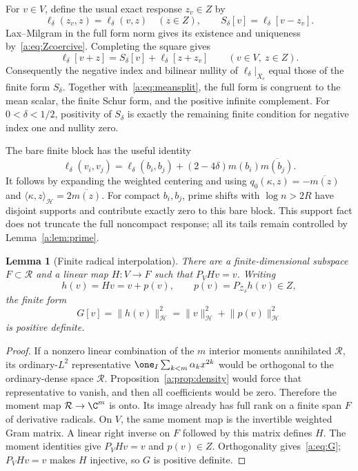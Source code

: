 \documentclass[11pt,a4paper]{article}
\numberwithin{equation}{section}
\newtheorem{lemma}[theorem]{Lemma}
\theoremstyle{definition}\newtheorem{definition}[theorem]{Definition}
\theoremstyle{remark}\newtheorem{remark}[theorem]{Remark}
\newcommand{\Hh}{\mathcal H}\newcommand{\Hw}{\mathcal H}
\newcommand{\ip}[2]{\langle#1,#2\rangle}\newcommand{\norm}[1]{\lVert#1\rVert}\newcommand{\abs}[1]{\lvert#1\rvert}
\newcommand{\Zc}{\mathcal Z_\delta}\newcommand{\Rcal}{\mathcal R}
\begin{document}
For $v\in V$, define the usual exact response $z_v\in Z$ by
\begin{equation}\label{a:eq:usualresponse}
 \ell_\delta(z_v,z)=\ell_\delta(v,z)\quad(z\in Z),\qquad
 S_\delta[v]=\ell_\delta[v-z_v].
\end{equation}
Lax--Milgram in the full form norm gives its existence and uniqueness by~\eqref{a:eq:Zcoercive}. Completing the square gives
\begin{equation}\label{a:eq:usualsquare}
 \ell_\delta[v+z]=S_\delta[v]+\ell_\delta[z+z_v]
                         \qquad(v\in V,\ z\in Z).
\end{equation}
Consequently the negative index and bilinear nullity of $\ell_\delta|_{X_c}$ equal those of the finite form $S_\delta$. Together with~\eqref{a:eq:meansplit}, the full form is congruent to the mean scalar, the finite Schur form, and the positive infinite complement. For $0<\delta<1/2$, positivity of $S_\delta$ is exactly the remaining finite condition for negative index one and nullity zero.

The bare finite block has the useful identity
\begin{equation}\label{a:eq:bareblock}
 \ell_\delta(v_i,v_j)=\ell_\delta(b_i,b_j)
       +(2-4\delta)m(b_i)\overline{m(b_j)}.
\end{equation}
It follows by expanding the weighted centering and using
$q_0(\kappa,z)=-\overline{m(z)}$ and
$\ip\kappa z_{\Hh}=2\overline{m(z)}$.
For compact $b_i,b_j$, prime shifts with $\log n>2R$ have disjoint supports and contribute exactly zero to this bare block. This support fact does not truncate the full noncompact response; all its tails remain controlled by Lemma~\ref{a:lem:prime}.

\begin{lemma}[Finite radical interpolation]\label{a:lem:lift}
There are a finite-dimensional subspace $F\subset\Rcal$ and a linear map $H:V\to F$ such that $P_VHv=v$. Writing
\begin{equation}\label{a:eq:liftdata}
 h(v)=Hv=v+p(v),\qquad p(v)=P_{\Zc}h(v)\in Z,
\end{equation}
the finite form
\begin{equation}\label{a:eq:G}
 G[v]=\norm{h(v)}_{\Hh}^2
     =\norm v_{\Hh}^2+\norm{p(v)}_{\Hh}^2
\end{equation}
is positive definite.
\end{lemma}
\begin{proof}
If a nonzero linear combination of the $m$ interior moments annihilated $\Rcal$, its ordinary-$L^2$ representative
$\one_I\sum_{k<m}\alpha_kx^{2k}$ would be orthogonal to the ordinary-dense space $\Rcal$. Proposition~\ref{a:prop:density} would force that representative to vanish, and then all coefficients would be zero. Therefore the moment map $\Rcal\to\C^m$ is onto. Its image already has full rank on a finite span $F$ of derivative radicals. On $V$, the same moment map is the invertible weighted Gram matrix. A linear right inverse on $F$ followed by this matrix defines $H$. The moment identities give $P_VHv=v$ and $p(v)\in Z$. Orthogonality gives~\eqref{a:eq:G}; $P_VHv=v$ makes $H$ injective, so $G$ is positive definite.
\end{proof}
\end{document}
